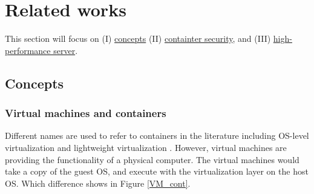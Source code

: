 \documentclass[12pt,a4paper]{article}
\begin{document}

\section{Related works}
This section will focus on (\RN{1}) \hyperlink{concepts}{concepts} (\RN{2}) \hyperlink{security}{containter security}, and (\RN{3})
\hyperlink{heigh_performance}{high-performance server}.

\subsection{Concepts}
\hypertarget{concepts}{}
\subsubsection{Virtual machines and containers}
Different names are used to refer to containers in the literature including OS-level
virtualization and lightweight virtualization \cite{Road_Ahead}. However, virtual
machines are providing the functionality of a physical computer. The virtual machines
would take a copy of the guest OS, and execute with the virtualization layer on
the host OS. Which difference shows in Figure \ref*{VM_cont}.
\end{document}
